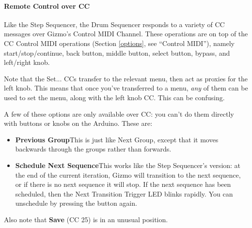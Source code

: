 \documentclass{article}
\begin{document}
\paragraph{Remote Control over CC}  Like the Step Sequencer, the Drum Sequencer responds to a variety of CC messages over Gizmo's Control MIDI Channel.  These operations are on top of the CC Control MIDI operations (Section \ref{options}, see ``Control MIDI''), namely start/stop/continue, back button, middle button, select button, bypass, and left/right knob.

Note that the Set... CCs transfer to the relevant menu, then act as proxies for the left knob.  This means that once you've transferred to a menu, {\it any} of them can be used to set the menu, along with the left knob CC.  This can be confusing.

A few of these options are only available over CC: you can't do them directly with buttons or knobs on the Arduino.  These are:

\begin{itemize}
\item {\bf Previous Group}\quad This is just like Next Group, except that it moves backwards through the groups rather than forwards.
\item {\bf Schedule Next Sequence}\quad This works like the Step Sequencer's version: at the end of the current iteration, Gizmo will transition to the next sequence, or if there is no next sequence it will stop.  If the next sequence has been scheduled, then the Next Transition Trigger LED blinks rapidly. You can unschedule by pressing the button again. 
\end{itemize}

Also note that {\bf Save} (CC 25) is in an unusual position.
\end{document}
